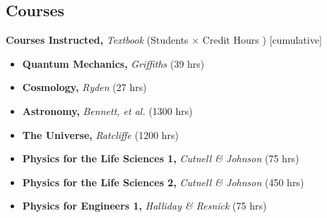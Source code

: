 \documentclass[11pt,letterpaper,sans,unicode]{moderncv}
\begin{document}
\subsection{Courses}
	\hspace{8mm}\textbf{\color{color1} Courses Instructed,} \emph{Textbook}  (Students $\times$ Credit Hours $\!$) {\footnotesize [cumulative]}

	\vspace*{1mm}

	\begin{itemize}[leftmargin=8mm]
        		\item \textbf{\color{color1} Quantum Mechanics,} \emph{Griffiths} (39 hrs)
			\item \textbf{\color{color1} Cosmology,} \emph{Ryden} (27 hrs)
			\item \textbf{\color{color1} Astronomy,} \emph{Bennett, et al.} (1300 hrs)
			\item \textbf{\color{color1} The Universe,} \emph{Ratcliffe} (1200 hrs)
			\item \textbf{\color{color1} Physics for the Life Sciences 1,} \emph{Cutnell \& Johnson} (75 hrs)
			\item \textbf{\color{color1} Physics for the Life Sciences 2,} \emph{Cutnell \& Johnson} (450 hrs)
			\item \textbf{\color{color1} Physics for Engineers 1,} \emph{Halliday \& Resnick} (75 hrs)
        \end{itemize}




\end{document}

